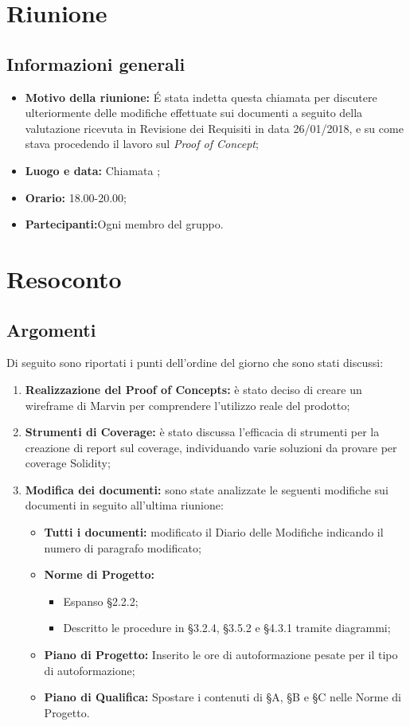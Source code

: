 \documentclass[VER-2018-05-02.tex]{subfiles}
\begin{document}
\chapter{Riunione}
\section{Informazioni generali}
\begin{itemize}
	\item \textbf{Motivo della riunione:} \'{E} stata indetta questa chiamata  per discutere ulteriormente delle modifiche effettuate sui documenti a seguito della valutazione ricevuta in Revisione dei Requisiti in data 26/01/2018, e su come stava procedendo il lavoro sul \textit{Proof of Concept};
	\item \textbf{Luogo e data:} Chiamata ;
	\item \textbf{Orario:} 18.00-20.00;
	\item \textbf{Partecipanti:}Ogni membro del gruppo.
\end{itemize}


\chapter{Resoconto}

\section{Argomenti}
Di seguito sono riportati i punti dell'ordine del giorno che sono stati discussi:
\begin{enumerate}
	\item \textbf{Realizzazione del Proof of Concepts:} è stato deciso di creare un wireframe di Marvin per comprendere l'utilizzo reale del prodotto;
	\item \textbf{Strumenti di Coverage:} è stato discussa l'efficacia di strumenti per la creazione di report sul coverage, individuando varie soluzioni da provare per coverage Solidity;	
	\item \textbf{Modifica dei documenti:} sono state analizzate le seguenti modifiche sui documenti in seguito all'ultima riunione:
	\begin{itemize}
		\item \textbf{Tutti i documenti:} modificato il Diario delle Modifiche indicando il numero di paragrafo modificato;
		\item \textbf{Norme di Progetto:} \begin{itemize}
										     \item Espanso \S 2.2.2;
										     \item Descritto le procedure in \S 3.2.4, \S 3.5.2 e \S 4.3.1 tramite diagrammi;
								           \end{itemize}
      \item \textbf{Piano di Progetto:} Inserito le ore di autoformazione pesate per il tipo di autoformazione;
      \item\textbf{Piano di Qualifica:} Spostare i contenuti di \S A, \S B e \S C nelle Norme di Progetto.
	\end{itemize}
\end{enumerate}
\end{document}
